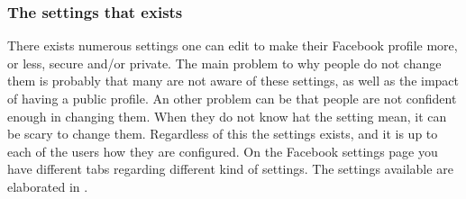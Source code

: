 \subsubsection{The settings that exists}
There exists numerous settings one can edit to make their Facebook profile more, or less, secure and/or private. The main problem to why people do not change them is probably that many  are not aware of these settings, as well as the impact of having a public profile.  An other problem can be that people are not confident enough in changing them. When they do not know hat the setting mean, it can be scary to change them. Regardless of this the settings exists, and it is up to each of the users how they are configured. 
On the Facebook settings page you have different tabs regarding different kind of settings. The settings available are elaborated in .

\newpage

